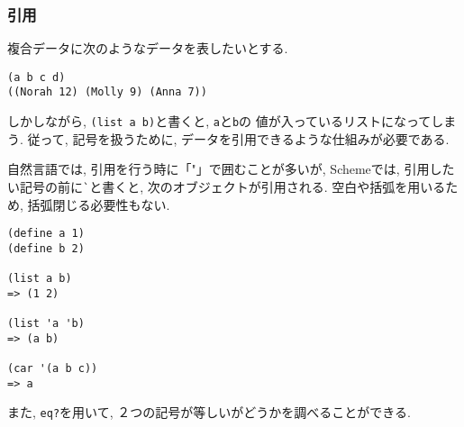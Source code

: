 \subsubsection{引用}
%
複合データに次のようなデータを表したいとする.
%
\begin{lstlisting}[basicstyle=\footnotesize,title=任意の記号の入ったデータ]
(a b c d)
((Norah 12) (Molly 9) (Anna 7))
\end{lstlisting}
%
しかしながら, \lstinline{(list a b)}と書くと,
\lstinline{a}と\lstinline{b}の
値が入っているリストになってしまう. 従って, 記号を扱うために,
データを引用できるような仕組みが必要である.

自然言語では, 引用を行う時に「"」で囲むことが多いが,
Schemeでは, 引用したい記号の前に\lstinline{`}と書くと,
次のオブジェクトが引用される. 空白や括弧を用いるため,
括弧閉じる必要性もない.

\begin{lstlisting}[basicstyle=\footnotesize,title=記号データの例]
(define a 1)
(define b 2)

(list a b)
=> (1 2)

(list 'a 'b)
=> (a b)

(car '(a b c))
=> a
\end{lstlisting}

また, \lstinline{eq?}を用いて, ２つの記号が等しいがどうかを調べることができる.
